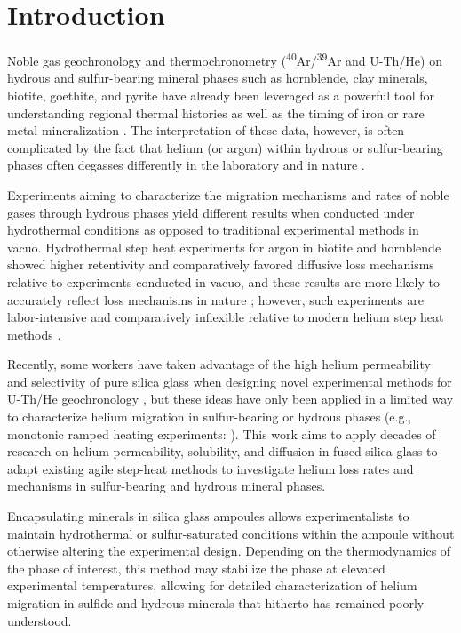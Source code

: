 \section{Introduction}

Noble gas geochronology and thermochronometry (\textsuperscript{40}Ar/\textsuperscript{39}Ar and U-Th/He) on hydrous and sulfur-bearing mineral phases such as hornblende, clay minerals, biotite, goethite, and pyrite have already been leveraged as a powerful tool for understanding regional thermal histories as well as the timing of iron or rare metal mineralization \citep{mcinnes2005,heim2006,vasconcelos2013,nomade2004,yakubovich2020,yakubovich2021}. The interpretation of these data, however, is often complicated by the fact that helium (or argon) within hydrous or sulfur-bearing phases often degasses differently in the laboratory and in nature \citep{hanson1975,lee1993,lo2000,farley2024}.

Experiments aiming to characterize the migration mechanisms and rates of noble gases through hydrous phases yield different results when conducted under hydrothermal conditions as opposed to traditional experimental methods in vacuo. Hydrothermal step heat experiments for argon in biotite and hornblende showed higher retentivity and comparatively favored diffusive loss mechanisms relative to experiments conducted in vacuo, and these results are more likely to accurately reflect loss mechanisms in nature \citep{harrison1982,harrison1985}; however, such experiments are labor-intensive and comparatively inflexible relative to modern helium step heat methods \citep{farley1999}.

Recently, some workers have taken advantage of the high helium permeability and selectivity of pure silica glass when designing novel experimental methods for U-Th/He geochronology \citep{yakubovich2020,yakubovich2021}, but these ideas have only been applied in a limited way to characterize helium migration in sulfur-bearing or hydrous phases (e.g., monotonic ramped heating experiments: \citealp{yakubovich2019}). This work aims to apply decades of research on helium permeability, solubility, and diffusion in fused silica glass \citep[e.g.,][]{jones1953,norton1953,rogers1954,altemose1961,swets1961,doremus1966,masaryk1968,shelby1971,shelby1972,shelby1976,shackelford1972} to adapt existing agile step-heat methods \citep{farley1999} to investigate helium loss rates and mechanisms in sulfur-bearing and hydrous mineral phases. 

Encapsulating minerals in silica glass ampoules allows experimentalists to maintain hydrothermal or sulfur-saturated conditions within the ampoule without otherwise altering the experimental design. Depending on the thermodynamics of the phase of interest, this method may stabilize the phase at elevated experimental temperatures, allowing for detailed characterization of helium migration in sulfide and hydrous minerals that hitherto has remained poorly understood.

